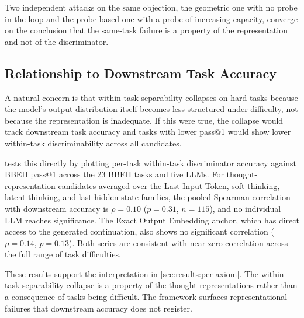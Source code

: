 Two independent attacks on the same objection, the geometric one with no probe in the loop and the probe-based one with a probe of increasing capacity, converge on the conclusion that the same-task failure is a property of the representation and not of the discriminator.

\subsection{Relationship to Downstream Task Accuracy}
\label{appendix:downstream}

A natural concern is that within-task separability collapses on hard tasks because the model's output distribution itself becomes less structured under difficulty, not because the representation is inadequate. If this were true, the collapse would track downstream task accuracy and tasks with lower pass@1 would show lower within-task discriminability across all candidates.

 tests this directly by plotting per-task within-task discriminator accuracy against BBEH pass@1 across the 23 BBEH tasks and five LLMs. For thought-representation candidates averaged over the Last Input Token, soft-thinking, latent-thinking, and last-hidden-state families, the pooled Spearman correlation with downstream accuracy is $\rho = 0.10$ ($p = 0.31$, $n = 115$), and no individual LLM reaches significance. The Exact Output Embedding anchor, which has direct access to the generated continuation, also shows no significant correlation ($\rho = 0.14$, $p = 0.13$). Both series are consistent with near-zero correlation across the full range of task difficulties.

These results support the interpretation in \cref{sec:results:per-axiom}. The within-task separability collapse is a property of the thought representations rather than a consequence of tasks being difficult. The framework surfaces representational failures that downstream accuracy does not register.


